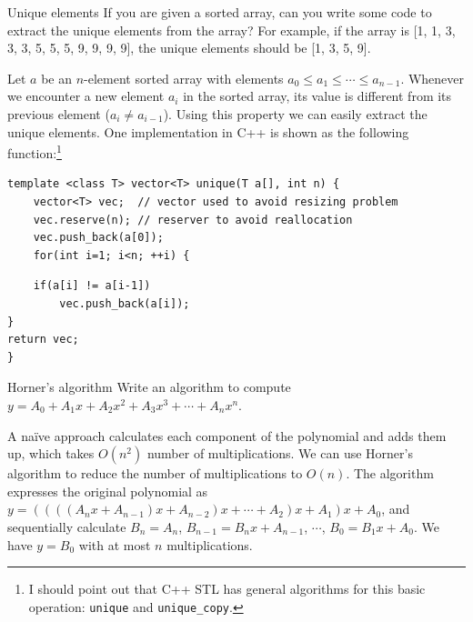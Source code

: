 \begin{problem}{Unique elements}
If you are given a sorted array, can you write some code to extract the unique elements
from the array? For example, if the array is [1, 1, 3, 3, 3, 5, 5, 5, 9, 9, 9, 9], the unique
elements should be [1, 3, 5, 9].
\end{problem}

\begin{solution}
Let $a$ be an $n$-element sorted array with elements
$a_0\leq a_1\leq\cdots\leq a_{n-1}$. Whenever we encounter a new element $a_i$ in the
sorted array, its value is different from its previous element ($a_i\neq a_{i-1}$). Using
this property we can easily extract the unique elements. One implementation in C++ is
shown as the following function:\footnote[3]{I should point out that C++ STL has general algorithms for this basic operation: \texttt{unique} and \texttt{unique\_copy}.}

\begin{verbatim}
template <class T> vector<T> unique(T a[], int n) {
    vector<T> vec;  // vector used to avoid resizing problem
    vec.reserve(n); // reserver to avoid reallocation
    vec.push_back(a[0]);
    for(int i=1; i<n; ++i) {
\end{verbatim}


\begin{verbatim}
    if(a[i] != a[i-1])
        vec.push_back(a[i]);
}
return vec;
}
\end{verbatim}

\end{solution}

\begin{problem}{Horner's algorithm}
Write an algorithm to compute $y=A_0+A_1x+A_2x^2+A_3x^3+\cdots+A_nx^n$.
\end{problem}

\begin{solution}
A na\"ive approach calculates each component of the polynomial and adds them up, which
takes $O(n^2)$ number of multiplications. We can use Horner's algorithm to reduce the
number of multiplications to $O(n)$. The algorithm expresses the original polynomial as
$y=((((A_nx+A_{n-1})x+A_{n-2})x+\cdots+A_2)x+A_1)x+A_0$, and sequentially
calculate $B_n=A_n$, $B_{n-1}=B_nx+A_{n-1}$, $\cdots$, $B_0=B_1x+A_0$. We have
$y=B_0$ with at most $n$ multiplications.

\end{solution}

